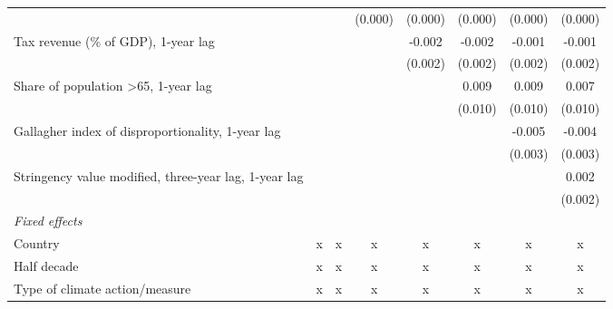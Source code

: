 \begin{tabular}{lccccccc}
                                                                 &                &                & (0.000)        & (0.000)       & (0.000)       & (0.000)       & (0.000)\\   
   Tax revenue (\% of GDP), 1-year lag                           &                &                &                & -0.002        & -0.002        & -0.001        & -0.001\\   
                                                                 &                &                &                & (0.002)       & (0.002)       & (0.002)       & (0.002)\\   
   Share of population >65, 1-year lag                           &                &                &                &               & 0.009         & 0.009         & 0.007\\   
                                                                 &                &                &                &               & (0.010)       & (0.010)       & (0.010)\\   
   Gallagher index of disproportionality, 1-year lag             &                &                &                &               &               & -0.005        & -0.004\\   
                                                                 &                &                &                &               &               & (0.003)       & (0.003)\\   
   Stringency value modified, three-year lag, 1-year lag         &                &                &                &               &               &               & 0.002\\   
                                                                 &                &                &                &               &               &               & (0.002)\\   
   \emph{Fixed effects}\\
   Country                                                       & x              & x              & x              & x             & x             & x             & x\\  
   Half decade                                                   & x              & x              & x              & x             & x             & x             & x\\  
   Type of climate action/measure                                & x              & x              & x              & x             & x             & x             & x\\  

\end{tabular}
